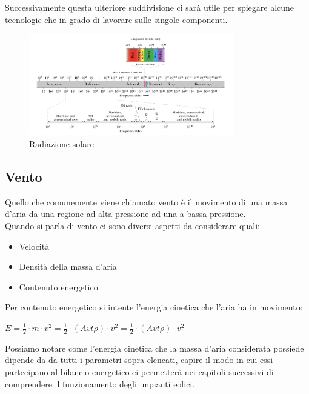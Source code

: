 Successivamente questa ulteriore suddivisione ci sarà utile per spiegare alcune tecnologie che in grado di lavorare sulle singole componenti.
\begin{figure}[H]
    \centering
    \includegraphics[width=0.8\textwidth]{res/cap2/luce_dettagli}
    \caption{Radiazione solare}
\end{figure}

\newpage
\subsection{Vento}

Quello che comunemente viene chiamato vento è il movimento di una massa d'aria da una regione ad alta pressione ad una a bassa pressione.\\
Quando si parla di vento ci sono diversi aspetti da considerare quali:
\begin{itemize}
    \item Velocità
    \item Densità della massa d'aria
    \item Contenuto energetico
\end{itemize}
\noindent 
Per contenuto energetico si intente l'energia cinetica che l'aria ha in movimento:
\begin{center}
    \large{\(E=\frac{1}{2}\cdot m\cdot v^2 = \frac{1}{2} \cdot(Avt\rho)\cdot v^2 = \frac{1}{2} \cdot(Avt\rho)\cdot v^2 \)}
\end{center}
\noindent
Possiamo notare come l'energia cinetica che la massa d'aria considerata possiede dipende da da tutti i parametri sopra elencati, capire il modo in cui essi partecipano al bilancio energetico ci permetterà nei capitoli successivi di comprendere il funzionamento degli impianti eolici.

